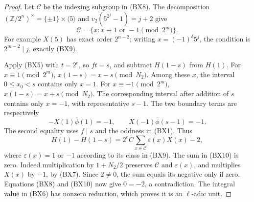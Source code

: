 \begin{proof}
Let \(\mathcal C\) be the indexing subgroup in (BX8).
The decomposition
\((\mathbb Z/2^n)^\times=\{\pm1\}\times\langle5\rangle\)
and \(v_2(5^{2^j}-1)=j+2\) give
\[
       \mathcal C
       =\{x:x\equiv1\text{ or }-1\pmod{2^m}\}.
 \tag{BX9}
\]
For example \(X(5)\) has exact order \(2^{n-2}\);
writing \(x=(-1)^\delta5^j\), the condition is
\(2^{m-2}\mid j\), exactly (BX9).

Apply (BX5) with \(t=2^e\), so \(ft=s\), and subtract
\(H(1-s)\) from \(H(1)\).
For \(x\equiv1\pmod{2^m}\),
\(x(1-s)=x-s\pmod{N_2}\).
Among these \(x\), the interval \(0\le x_0<s\)
contains only \(x=1\).
For \(x\equiv-1\pmod{2^m}\),
\(x(1-s)=x+s\pmod{N_2}\).
The corresponding interval after addition of \(s\)
contains only \(x=-1\), with representative \(s-1\).
The two boundary terms are respectively
\[
                    -X(1)\bar\phi(1)=-1,\qquad
                   X(-1)\bar\phi(s-1)=-1 .
\]
The second equality uses \(f\mid s\) and the oddness
in (BX1).
Thus
\[
 H(1)-H(1-s)
  =2^e\bar C\sum_{x\in\mathcal C}\varepsilon(x)X(x)-2,
 \tag{BX10}
\]
where \(\varepsilon(x)=1\) or \(-1\) according to its
class in (BX9).
The sum in (BX10) is zero.
Indeed multiplication by \(1+N_2/2\) preserves
\(\mathcal C\) and \(\varepsilon(x)\), and multiplies
\(X(x)\) by \(-1\), by (BX7).
Since \(2\ne0\), the sum equals its negative only if zero.
Equations (BX8) and (BX10) now give \(0=-2\),
a contradiction.
The integral value in (BX6) has nonzero reduction,
which proves it is an \(\ell\)-adic unit.
\end{proof}


